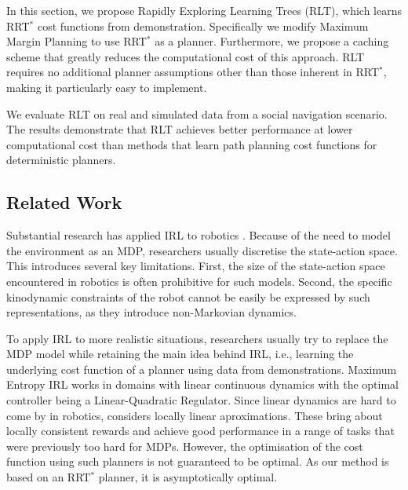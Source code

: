 \documentclass[a4paper,11pt]{report}
\begin{document}
In this section, we propose Rapidly Exploring Learning Trees (RLT), which learns RRT$^*$ cost functions from demonstration. Specifically we modify Maximum Margin Planning to use RRT$^*$ as a planner. Furthermore, we propose a caching scheme that greatly reduces the computational cost of this approach. RLT requires no additional planner assumptions other than those inherent in RRT$^*$, making it particularly easy to implement. 

We evaluate RLT on real and simulated data from a social navigation scenario. The results demonstrate that RLT achieves better performance at lower computational cost than methods that learn path planning cost functions for deterministic planners.

\subsection{Related Work}

Substantial research has applied IRL to robotics \cite{henry2010learning,abbeel2008apprenticeship,vasquez2014inverse}. Because of the need to model the environment as an MDP, researchers usually discretise the state-action space. This introduces several key limitations. First, the size of the state-action space encountered in robotics is often prohibitive for such models. Second, the specific kinodynamic constraints of the robot cannot be easily be expressed by such representations, as they introduce non-Markovian dynamics. 


To apply IRL to more realistic situations, researchers usually try to replace the MDP model while retaining the main idea behind IRL, i.e., learning the underlying cost function of a planner using data from demonstrations. Maximum Entropy IRL \cite{ziebart2010modelingthesis} works in domains with linear continuous dynamics with the optimal controller being a Linear-Quadratic Regulator. Since linear dynamics are hard to come by in robotics, \cite{2012-cioc} considers locally linear aproximations. These bring about locally consistent rewards and achieve good performance in a range of tasks that were previously too hard for MDPs. However, the optimisation of the cost function using such planners is not guaranteed to be optimal. As our method is based on an RRT$^*$ planner, it is asymptotically optimal.
\end{document}
